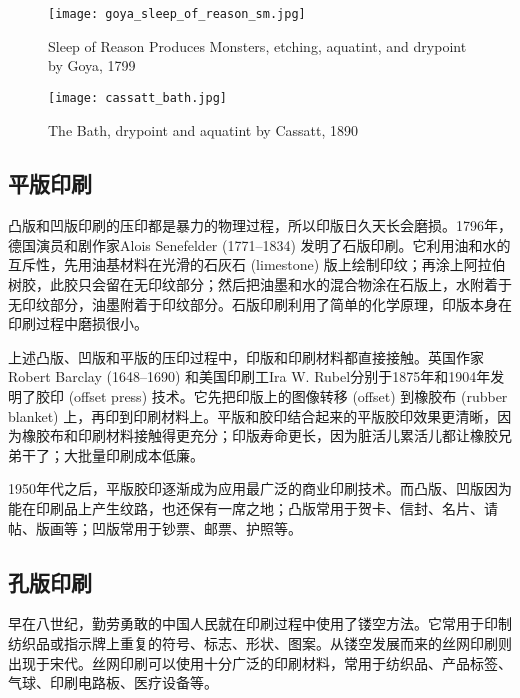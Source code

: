 \begin{figure}[htbp]
\centering
\begin{minipage}[t]{0.42\textwidth}
\centering
\texttt{[image: goya\_sleep\_of\_reason\_sm.jpg]}
\caption{Sleep of Reason Produces Monsters, etching, aquatint, and drypoint by Goya, 1799}
\label{fig:goya}
\end{minipage}
\hspace{5pt}
\begin{minipage}[t]{0.48\textwidth}
\centering
\texttt{[image: cassatt\_bath.jpg]}
\caption{The Bath, drypoint and aquatint by Cassatt, 1890}
\label{fig:cassatt}
\end{minipage}
\end{figure}

\subsection{平版印刷}

凸版和凹版印刷的压印都是暴力的物理过程，所以印版日久天长会磨损。1796年，德国演员和剧作家Alois Senefelder (1771--1834)\indexSenefelder{} 发明了石版印刷。它利用油和水的互斥性，先用油基材料在光滑的石灰石 (limestone) 版上绘制印纹；再涂上阿拉伯树胶，此胶只会留在无印纹部分；然后把油墨和水的混合物涂在石版上，水附着于无印纹部分，油墨附着于印纹部分。石版印刷利用了简单的化学原理，印版本身在印刷过程中磨损很小。

上述凸版、凹版和平版的压印过程中，印版和印刷材料都直接接触。英国作家Robert Barclay (1648--1690)\indexBarclay{} 和美国印刷工Ira W. Rubel\indexRubel{}分别于1875年和1904年发明了胶印 (offset press) 技术。它先把印版上的图像转移 (offset) 到橡胶布 (rubber blanket) 上，再印到印刷材料上。平版和胶印结合起来的平版胶印效果更清晰，因为橡胶布和印刷材料接触得更充分；印版寿命更长，因为脏活儿累活儿都让橡胶兄弟干了；大批量印刷成本低廉。

1950年代之后，平版胶印逐渐成为应用最广泛的商业印刷技术。而凸版、凹版因为能在印刷品上产生纹路，也还保有一席之地；凸版常用于贺卡、信封、名片、请帖、版画等；凹版常用于钞票、邮票、护照等。

\subsection{孔版印刷}

早在八世纪，勤劳勇敢的中国人民就在印刷过程中使用了镂空方法。它常用于印制纺织品或指示牌上重复的符号、标志、形状、图案。从镂空发展而来的丝网印刷则出现于宋代。丝网印刷可以使用十分广泛的印刷材料，常用于纺织品、产品标签、气球、印刷电路板、医疗设备等。

